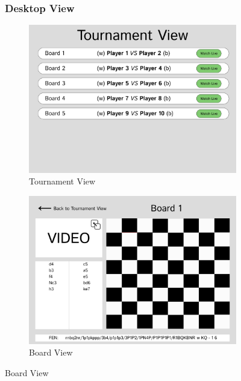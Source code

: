 \begin{figure}[h!]
\subsubsection*{Desktop View}
    \centering
    \begin{subfigure}[h!]{0.45\linewidth}
        \centering
        \includegraphics[width=\linewidth]{figures/methods/wireframes/desktop-tournament-view.png}
        \caption{Tournament View}
        \label{fig:desktoop-tournament-view}
    \end{subfigure}
    \hfill
    \begin{subfigure}[h!]{0.45\linewidth}
        \centering
        \includegraphics[width=\linewidth]{figures/methods/wireframes/desktop-board-view.png}
        \caption{Board View}
        \label{fig:desktop-board-view}
    \end{subfigure}
    

\end{figure}
